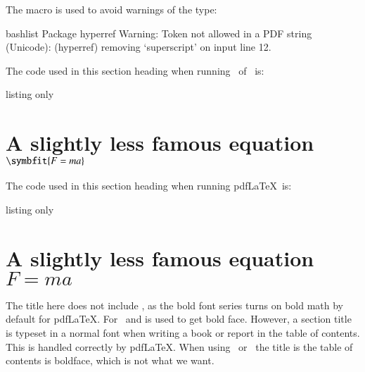 The macro  is used to avoid  warnings of the type:
\begin{tcblisting}{bashlist}
Package hyperref Warning: Token not allowed in a PDF string (Unicode):
(hyperref)                removing `superscript' on input line 12.  
\end{tcblisting}

\label{sec:fma}

The code used in this section heading when running \LuaLaTeX\ of \XeLaTeX\ is:
\begin{tcblisting}{listing only}
\section{A slightly less famous equation \texorpdfstring{$\symbfit{F = m a}$}{F = ma}}%
\end{tcblisting}
The code used in this section heading when running pdf\LaTeX\ is:
\begin{tcblisting}{listing only}
\section{A slightly less famous equation \texorpdfstring{$F = m a$}{F = ma}}%
\end{tcblisting}

The title here does not include ,
as the bold font series turns on bold math by default for pdf\LaTeX.
For \LuaLaTeX\ and \XeLaTeX {} is used to get bold face.
However, a section title is typeset in a normal font when
writing a book or report in the table of contents.
This is handled correctly by pdf\LaTeX.
When using \LuaLaTeX\ or \XeLaTeX\ the title is the table of contents is boldface,
which is not what we want.


